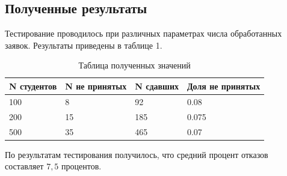 \subsection*{Полученные результаты}
Тестирование проводилось при различных параметрах числа обработанных заявок. 
Результаты приведены в таблице 1.

\FloatBarrier
\begin{table}[h]
	\caption{Таблица полученных значений}
	\centering
	\begin{tabular}{ | l | l | l | l |}
		\hline
		N студентов & N не принятых & N сдавших & Доля не принятых \\ 
		\hline
		100 & 8 & 92 & 0.08  \\
		\hline
		200 & 15 & 185 & 0.075  \\
		\hline
		500 & 35 & 465 & 0.07  \\
		\hline
	\end{tabular}
\end{table}

По результатам тестирования получилось, что средний процент отказов составляет $7,5$ процентов.
